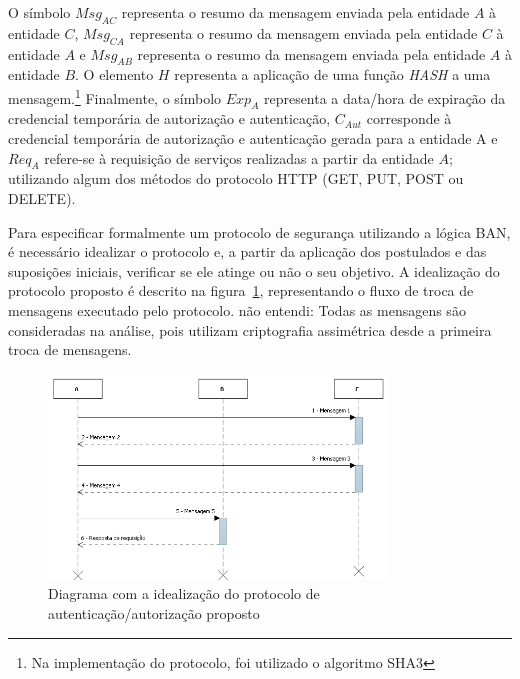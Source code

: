 O símbolo ${Msg_{AC}}$ representa o resumo da mensagem enviada pela entidade ${A}$ \`{a} entidade ${C}$,  ${Msg_{CA}}$ representa o resumo da mensagem enviada pela entidade ${C}$
\`{a} entidade ${A}$ e ${Msg_{AB}}$ representa o resumo da mensagem enviada pela entidade ${A}$ \`{a} entidade ${B}$. O elemento ${H}$ representa a aplica\c c\~{a}o de
uma fun\c c\~{a}o \emph{HASH} a uma mensagem.\footnote{Na implementa\c c\~{a}o do protocolo, foi utilizado o algoritmo SHA3}
Finalmente, o símbolo ${Exp_A}$ representa a data/hora  de expiração da credencial temporária de autorização e autenticação, ${C_{Aut}}$ corresponde à credencial temporária de autorização e autenticação gerada para a entidade A e ${Req_A}$ refere-se à requisição de serviços realizadas a partir da entidade $A$;
utilizando algum dos m\'{e}todos do protocolo HTTP (GET, PUT, POST ou DELETE).

Para especificar formalmente um protocolo de segurança utilizando a lógica BAN, é necessário idealizar o protocolo e, a partir da aplicação dos postulados e das suposições iniciais, verificar se ele atinge ou não o seu objetivo. A idealização do protocolo proposto \'{e} descrito na figura~\ref{fig:protocoidealizado}, representando o fluxo de troca de mensagens executado pelo protocolo. {\color{blue}n\~{a}o entendi: Todas as mensagens são consideradas na análise, pois utilizam criptografia assimétrica desde a primeira troca de mensagens}.

\begin{figure}[!htb]
    \centering
    \includegraphics[width=0.8\textwidth]{fluxo_autenticacao_BAN.png}
    \caption{Diagrama com a idealização do protocolo de autenticação/autorização proposto}
    \label{fig:protocoidealizado}
\end{figure}

